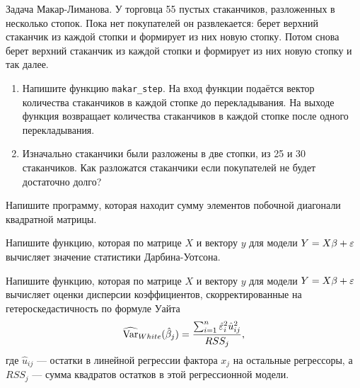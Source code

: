 \begin{problem}
Задача Макар-Лиманова. У торговца 55 пустых стаканчиков, разложенных в несколько стопок. Пока нет покупателей он развлекается: берет верхний стаканчик из каждой стопки и формирует из них новую стопку. Потом снова берет верхний стаканчик из каждой стопки и формирует из них новую стопку и так далее.
\begin{enumerate}
\item Напишите функцию \verb|makar_step|. На вход функции подаётся вектор количества стаканчиков в каждой стопке до перекладывания. На выходе функция возвращает количества стаканчиков в каждой стопке после одного перекладывания.
\item Изначально стаканчики были разложены в две стопки, из 25 и 30 стаканчиков. Как разложатся стаканчики если покупателей не будет достаточно долго?
\end{enumerate}


\begin{sol}
\end{sol}
\end{problem}



\begin{problem}
Напишите программу, которая находит сумму элементов побочной диагонали квадратной матрицы.
\begin{sol}
\end{sol}
\end{problem}



\begin{problem}
Напишите функцию, которая по матрице $X$ и вектору $y$ для модели $Y=X\beta+\varepsilon$ вычисляет значение статистики Дарбина-Уотсона.
\begin{sol}
\end{sol}
\end{problem}


\begin{problem}
Напишите функцию, которая по матрице $X$ и вектору $y$ для модели $Y=X\beta+\varepsilon$ вычисляет оценки дисперсии коэффициентов, скорректированные на гетероскедастичность по формуле Уайта
\[
\widehat{\operatorname{Var}}_{White}(\hat{\beta}_j)=\frac{\sum_{i=1}^{n}\hat{\varepsilon}_i^2\hat{u}_{ij}^2}{RSS_j},
\]
где $\hat{u}_{ij}$ — остатки в линейной регрессии фактора $x_j$ на остальные регрессоры, а $RSS_j$ — сумма квадратов остатков в этой регрессионной модели.


\begin{sol}
\end{sol}
\end{problem}




